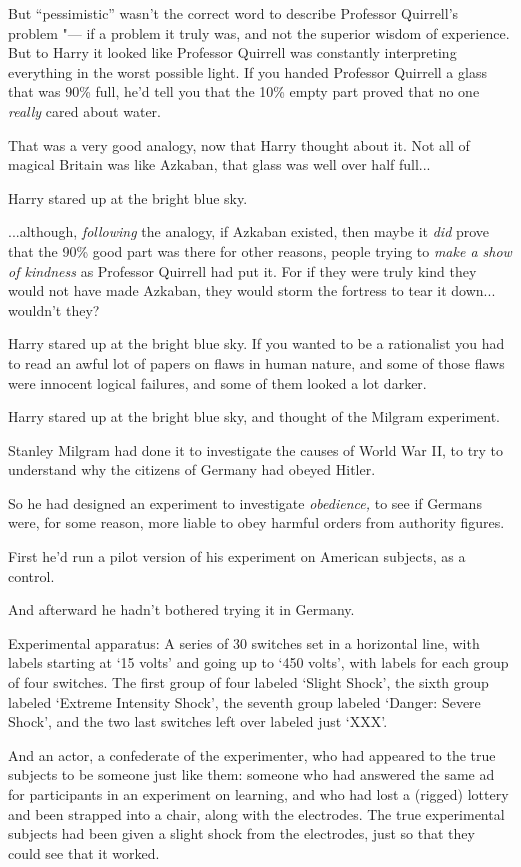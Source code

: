 But ``pessimistic'' wasn't the correct word to describe Professor
Quirrell's problem "--- if a problem it truly was, and not the superior
wisdom of experience. But to Harry it looked like Professor Quirrell was
constantly interpreting everything in the worst possible light. If you
handed Professor Quirrell a glass that was 90\% full, he'd tell you that
the 10\% empty part proved that no one \emph{really} cared about water.

That was a very good analogy, now that Harry thought about it. Not all
of magical Britain was like Azkaban, that glass was well over half
full...

Harry stared up at the bright blue sky.

...although, \emph{following} the analogy, if Azkaban existed, then
maybe it \emph{did} prove that the 90\% good part was there for other
reasons, people trying to \emph{make a show of kindness} as Professor
Quirrell had put it. For if they were truly kind they would not have
made Azkaban, they would storm the fortress to tear it down...
wouldn't they?

Harry stared up at the bright blue sky. If you wanted to be a
rationalist you had to read an awful lot of papers on flaws in human
nature, and some of those flaws were innocent logical failures, and some
of them looked a lot darker.

Harry stared up at the bright blue sky, and thought of the Milgram
experiment.

Stanley Milgram had done it to investigate the causes of World War II,
to try to understand why the citizens of Germany had obeyed Hitler.

So he had designed an experiment to investigate \emph{obedience,} to see
if Germans were, for some reason, more liable to obey harmful orders
from authority figures.

First he'd run a pilot version of his experiment on American subjects,
as a control.

And afterward he hadn't bothered trying it in Germany.

Experimental apparatus: A series of 30 switches set in a horizontal
line, with labels starting at `15 volts' and going up to `450 volts',
with labels for each group of four switches. The first group of four
labeled `Slight Shock', the sixth group labeled `Extreme Intensity
Shock', the seventh group labeled `Danger: Severe Shock', and the two
last switches left over labeled just `XXX'.

And an actor, a confederate of the experimenter, who had appeared to the
true subjects to be someone just like them: someone who had answered the
same ad for participants in an experiment on learning, and who had lost
a (rigged) lottery and been strapped into a chair, along with the
electrodes. The true experimental subjects had been given a slight shock
from the electrodes, just so that they could see that it worked.

